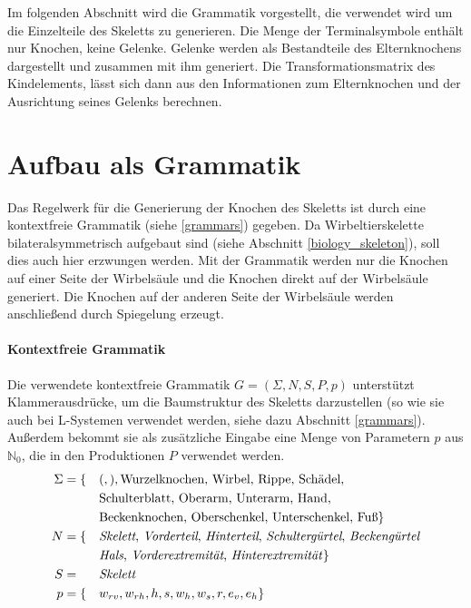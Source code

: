 Im folgenden Abschnitt wird die Grammatik vorgestellt, die verwendet wird um die Einzelteile des Skeletts zu generieren. Die Menge der Terminalsymbole enthält nur Knochen, keine Gelenke. Gelenke werden als Bestandteile des Elternknochens dargestellt und zusammen mit ihm generiert. Die Transformationsmatrix des Kindelements, lässt sich dann aus den Informationen zum Elternknochen und der Ausrichtung seines Gelenks berechnen.


\section{Aufbau als Grammatik}
\label{section:grammar}

Das Regelwerk für die Generierung der Knochen des Skeletts ist durch eine kontextfreie Grammatik (siehe \ref{grammars}) gegeben. Da Wirbeltierskelette bilateralsymmetrisch aufgebaut sind (siehe Abschnitt \ref{biology_skeleton}), soll dies auch hier erzwungen werden. Mit der Grammatik werden nur die Knochen auf einer Seite der Wirbelsäule und die Knochen direkt auf der Wirbelsäule generiert. Die Knochen auf der anderen Seite der Wirbelsäule werden anschließend durch Spiegelung erzeugt.

\paragraph{Kontextfreie Grammatik}
Die verwendete kontextfreie Grammatik $G = (\Sigma, N, S, P, p)$ unterstützt Klammerausdrücke, um die Baumstruktur des Skeletts darzustellen (so wie sie auch bei L-Systemen verwendet werden, siehe dazu Abschnitt \ref{grammars}). Außerdem bekommt sie als zusätzliche Eingabe eine Menge von Parametern $p$ aus $\mathbb{N}_0$, die in den Produktionen $P$ verwendet werden.
\begin{alignat*}{2}
 \Sigma & = \{&&(, ), \text{Wurzelknochen, Wirbel, Rippe, Schädel,}\\  
        & &&\text{Schulterblatt, Oberarm, Unterarm, Hand,}\\ 
        & &&\text{Beckenknochen, Oberschenkel, Unterschenkel, Fuß}\}\\
 N &= \{&&\text{\emph{Skelett}, \emph{Vorderteil}, \emph{Hinterteil}, \emph{Schultergürtel}, \emph{Beckengürtel}}\\
        & &&\text{\emph{Hals}, \emph{Vorderextremität}, \emph{Hinterextremität}}\}\\
 S &= &&\text{\emph{Skelett}}\\
 p &= \{&&w_{rv}, w_{rh}, h, s, w_h, w_s, r, e_v, e_h \}
\end{alignat*}

